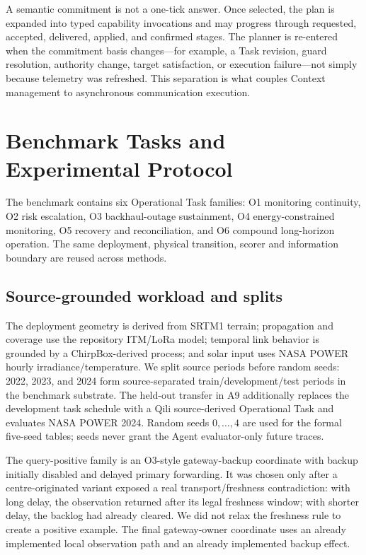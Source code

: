 \documentclass[journal,10pt]{IEEEtran}
\begin{document}
A semantic commitment is not a one-tick answer. Once selected, the plan is expanded into typed
capability invocations and may progress through requested, accepted, delivered, applied, and
confirmed stages. The planner is re-entered when the commitment basis changes---for example, a
Task revision, guard resolution, authority change, target satisfaction, or execution failure---not
simply because telemetry was refreshed. This separation is what couples Context management to
asynchronous communication execution.

\section{Benchmark Tasks and Experimental Protocol}
\label{sec:protocol}
The benchmark contains six Operational Task families: O1 monitoring continuity, O2 risk
escalation, O3 backhaul-outage sustainment, O4 energy-constrained monitoring, O5 recovery and
reconciliation, and O6 compound long-horizon operation. The same deployment, physical transition,
scorer and information boundary are reused across methods.

\begin{table}[t]
\centering\small
\caption{Operational Task families. Tasks change authorised objectives/disturbances while reusing
the same communication substrate, evidence semantics, capability registry, and scorer.}
\label{tab:tasks}
\resizebox{\textwidth}{!}{}
\end{table}

\subsection{Source-grounded workload and splits}
The deployment geometry is derived from SRTM1 terrain; propagation and coverage use the repository
ITM/LoRa model; temporal link behavior is grounded by a ChirpBox-derived process; and solar input
uses NASA POWER hourly irradiance/temperature. We split source periods before random seeds: 2022,
2023, and 2024 form source-separated train/development/test periods in the benchmark substrate.
The held-out transfer in A9 additionally replaces the development task schedule with a Qili
source-derived Operational Task and evaluates NASA POWER 2024. Random seeds $0,\ldots,4$ are used
for the formal five-seed tables; seeds never grant the Agent evaluator-only future traces.

The query-positive family is an O3-style gateway-backup coordinate with backup initially disabled
and delayed primary forwarding. It was chosen only after a centre-originated variant exposed a
real transport/freshness contradiction: with long delay, the observation returned after its legal
freshness window; with shorter delay, the backlog had already cleared. We did not relax the
freshness rule to create a positive example. The final gateway-owner coordinate uses an already
implemented local observation path and an already implemented backup effect.
\end{document}
